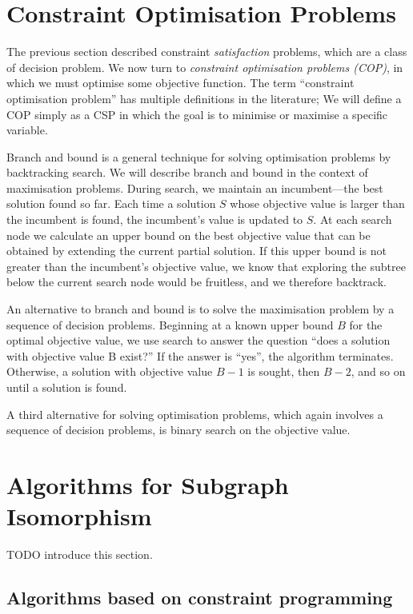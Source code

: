 \section{Constraint Optimisation Problems}

The previous section described constraint \emph{satisfaction} problems, which
are a class of decision problem. We now turn to \emph{constraint optimisation
problems (COP)}, in which we must optimise some objective function.  The term
``constraint optimisation problem'' has multiple definitions in the literature;
We will define a COP simply as a CSP in which the goal is to minimise or
maximise a specific variable.

Branch and bound \citep{land2010automatic} is a general technique for solving
optimisation problems by backtracking search. We will describe branch and bound
in the context of maximisation problems.  
During search, we maintain an incumbent---the best solution found so far. Each
time a solution $S$ whose objective value is larger than the incumbent is found,
the incumbent’s value is updated to $S$. At each search node we calculate an
upper bound on the best objective value that can be obtained by extending the
current partial solution. If this upper bound is not greater than the
incumbent’s objective value, we know that exploring the subtree below the
current search node would be fruitless, and we therefore backtrack.

An alternative to branch and bound is to solve the maximisation problem by a
sequence of decision problems. Beginning at a known upper bound $B$ for the
optimal objective value, we use search to answer the question “does a solution
with objective value B exist?” If the answer is “yes”, the algorithm
terminates. Otherwise, a solution with objective value $B-1$ is sought, then $B-2$,
and so on until a solution is found.

A third alternative for solving optimisation problems, which again involves a
sequence of decision problems, is binary search on the objective value.

\section{Algorithms for Subgraph Isomorphism} 

TODO introduce this section.

\subsection{Algorithms based on constraint programming}

